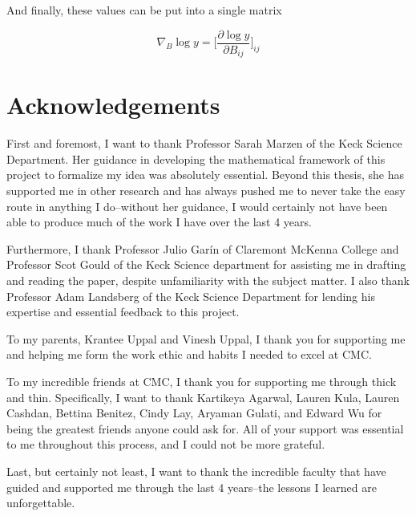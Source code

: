\documentclass[12pt]{article}
\theoremstyle{definition}
\begin{document}
And finally, these values can be put into a single matrix

\begin{equation}
    \nabla_B \log y = \bigg[\frac{\partial \log y}{\partial B_{ij}} \bigg]_{ij}
\end{equation}

\newpage
\section{Acknowledgements}

First and foremost, I want to thank Professor Sarah Marzen of the Keck Science Department. Her guidance in developing the mathematical framework of this project to formalize my idea was absolutely essential. Beyond this thesis, she has supported me in other research and has always pushed me to never take the easy route in anything I do--without her guidance, I would certainly not have been able to produce much of the work I have over the last 4 years.

Furthermore, I thank Professor Julio Garín of Claremont McKenna College and Professor Scot Gould of the Keck Science department for assisting me in drafting and reading the paper, despite unfamiliarity with the subject matter. I also thank Professor Adam Landsberg of the Keck Science Department for lending his expertise and essential feedback to this project.

To my parents, Krantee Uppal and Vinesh Uppal, I thank you for supporting me and helping me form the work ethic and habits I needed to excel at CMC.

To my incredible friends at CMC, I thank you for supporting me through thick and thin. Specifically, I want to thank Kartikeya Agarwal, Lauren Kula, Lauren Cashdan, Bettina Benitez, Cindy Lay, Aryaman Gulati, and Edward Wu for being the greatest friends anyone could ask for. All of your support was essential to me throughout this process, and I could not be more grateful.

Last, but certainly not least, I want to thank the incredible faculty that have guided and supported me through the last 4 years--the lessons I learned are unforgettable.

\newpage 

\printbibliography
\end{document}
